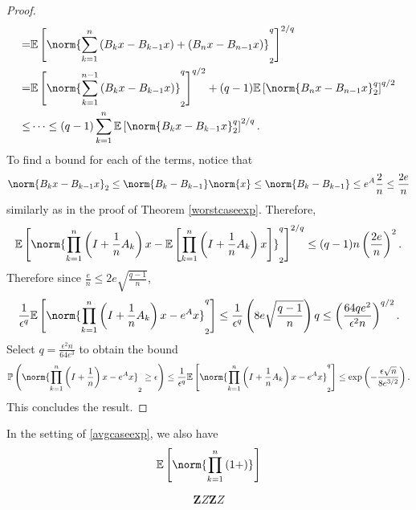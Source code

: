 \begin{proof}
\begin{align*}
                                                                                                                                                                       =& \mathbb{E} \left[ \norm{ \sum_{k=1}^{n}  \left(B_kx-B_{k-1}x\right)+ (B_nx-B_{n-1}x)}_{2}^{q}\right]^{2/q} \\
                                                                                                                                                                        =& \mathbb{E}\left[\norm{\sum_{k=1}^{n-1} \left(B_kx-B_{k-1}x\right)}_2^{q}\right]^{q/2} + (q-1) \mathbb{E}\left[ \norm{ B_n x-B_{n-1}x}_{2}^{q}\right]^{q/2} \\
                                                                                                                                                                        \leq& \dots
                                                                                                                                                                            \leq  (q-1) \sum_{k=1}^{n} \mathbb{E}\left[\norm{B_{k}x-B_{k-1}x}_{2}^{q}\right]^{2/q}.
    \end{align*}
    To find a bound for each of the terms, notice that 
    \[ \norm{B_kx-B_{k-1}x}_{2} \leq \norm{B_k-B_{k-1}} \norm{x} \leq \norm{B_k-B_{k-1}} \leq e^{A}\frac{2}{n} \leq \frac{2e}{n} \]
    similarly as in the proof of Theorem \ref{worstcaseexp}. Therefore,
  \[ \mathbb{E}\left[ \norm{\prod_{k=1}^{n} \left(I+\frac{1}{n}A_k\right)x - \mathbb{E}\left[\prod_{k=1}^{n}\left(I+\frac{1}{n}A_k\right)x \right]}_{2}^{q}\right]^{2/q}  \leq (q-1) n \left(\frac{2e}{n}\right)^{2}.\]
  Therefore since \( \frac{e}{n} \leq  2e\sqrt{\frac{q-1}{n}}  \), 
   \[ \frac{1}{\epsilon^{q}} \mathbb{E}\left[ \norm{ \prod_{k=1}^{n}\left(I+\frac{1}{n}A_k\right)x - e^{A}x}_{2}^{q}\right]  \leq \frac{1}{\epsilon^{q}} \left(8 e \sqrt{\frac{q-1}{n}}\right)q \leq \left(\frac{64 q e^{2}}{\epsilon^{2} n}\right)^{q/2}.\]
   Select \( q= \frac{\epsilon^{2}n}{64 e^{3}} \) to obtain the bound
   \[ \mathbb{P}\left( \norm{ \prod_{k=1}^{n} \left(I+\frac{1}{n} \right)x- e^{A}x}_{2} \geq \epsilon\right)  \leq \frac{1}{\epsilon ^{q}} \mathbb{E}\left[\norm{\prod_{k=1}^{n}\left(I+\frac{1}{n}A_k\right)x-e^{A}x}_{2}^{q} \right] \leq \operatorname{exp} \left(- \frac{\epsilon \sqrt{n}}{8e^{3/2}}\right). \]
   This concludes the result.

\end{proof}


\begin{corl}
  In the setting of \ref{avgcaseexp}, we also have
  \[ \mathbb{E}\left[\norm{\prod_{k=1}^{n}\left(1+\right)}_{}\right] \]
    
\end{corl}

\[ \bm{Z}Z\mathbf{Z}Z \]
